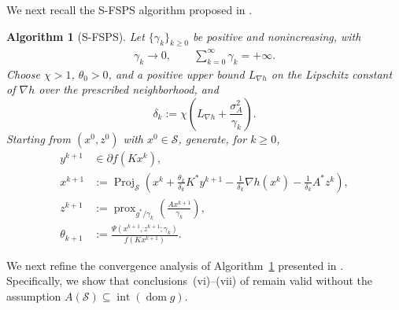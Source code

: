 \documentclass[11pt]{article}
\numberwithin{equation}{section}
\newtheorem{algorithm}[theorem]{Algorithm}
\newcommand{\prox}{\operatorname{prox}}
\newcommand{\Proj}{\operatorname{Proj}}
\DeclareMathOperator{\dom}{dom}
\begin{document}
\noindent We next recall the S-FSPS algorithm proposed in  \cite[Algorithm~4.1]{BotLiTao2025}.
\begin{algorithm}[S-FSPS]\label{alg:sfsps}
Let $\{\gamma_k\}_{k\ge0}$ be positive and nonincreasing, with
\begin{eqnarray}\label{eq:gammak}
\gamma_k\to0,
\qquad
\sum_{k=0}^{\infty}\gamma_k=+\infty.
\end{eqnarray}
Choose $\chi>1$, $\theta_0>0$, and a positive upper bound $L_{\nabla h}$ on the Lipschitz constant of
$\nabla h$ over the prescribed neighborhood, and
\begin{equation}\label{eq:delta-general}
\delta_k:=\chi\left(L_{\nabla h}+\frac{\sigma_A^2}{\gamma_k}\right).
\end{equation}
Starting from $(x^0,z^0)$ with $x^0\in\mathcal S$, generate, for $k\ge0$,
\begin{align}
 y^{k+1}&\in\partial f(Kx^k),\label{eq:y-update}\\
 x^{k+1}&:=\Proj_{\mathcal S}\left(
 x^k+\frac{\theta_k}{\delta_k}K^*y^{k+1}
 -\frac{1}{\delta_k}\nabla h(x^k)
 -\frac{1}{\delta_k}A^*z^k\right),\label{eq:x-update}\\
 z^{k+1}&:=\prox_{g^*/\gamma_k}\left(\frac{Ax^{k+1}}{\gamma_k}\right),\label{eq:z-update}\\
 \theta_{k+1}&:=\frac{\Psi(x^{k+1},z^{k+1};\gamma_k)}{f(Kx^{k+1})}.
 \label{eq:theta-update}
\end{align}
\end{algorithm}
We next refine the convergence analysis of
Algorithm~\ref{alg:sfsps} presented in \cite{BotLiTao2025}.
Specifically, we show that conclusions~(vi)--(vii) of
\cite[Theorem~4.3]{BotLiTao2025} remain valid without the assumption
$
    A(\mathcal{S})\subseteq\operatorname{int}(\dom g).$
\end{document}
